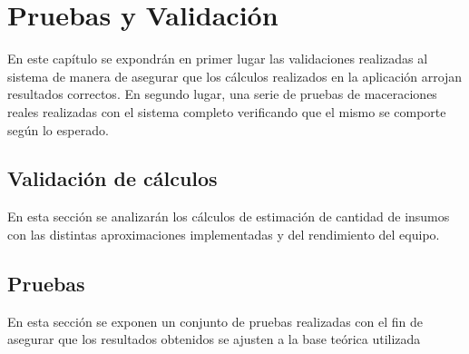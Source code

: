 \chapter{Pruebas y Validación}

\par En este capítulo se expondrán en primer lugar las validaciones realizadas al sistema de manera de asegurar que los cálculos realizados en la aplicación arrojan resultados correctos. En segundo lugar, una serie de pruebas de maceraciones reales realizadas con el sistema completo verificando que el mismo se comporte según lo esperado.


\section{Validación de cálculos}
\par En esta sección se analizarán los cálculos de estimación de cantidad de insumos con las distintas aproximaciones implementadas y del rendimiento del equipo.

\section{Pruebas}
\par En esta sección se exponen un conjunto de pruebas realizadas con el fin de asegurar que los resultados obtenidos se ajusten a la base teórica utilizada
